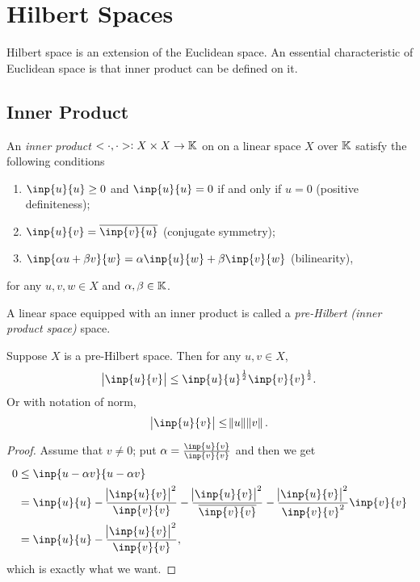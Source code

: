 \chapter{Hilbert Spaces}
\label{chp:hilbert_spaces}
Hilbert space is an extension of the Euclidean space. 
An essential characteristic of Euclidean space is that inner product can be 
defined on it. 

\section{Inner Product}
\begin{defn}
An \emph{inner product} $<\cdot, \cdot>: X \times X \to \mathbb{K}$ on on a linear 
space $X$ over $\mathbb{K}$ satisfy the following conditions
\begin{enumerate}
    \item $\inp{u}{u} \ge 0$ and $\inp{u}{u} = 0$ if and only if $u = 0$ 
    (positive definiteness);
    \item $\inp{u}{v} = \conj{\inp{v}{u}}$ (conjugate symmetry);
    \item $\inp{\alpha u + \beta v}{w} = \alpha \inp{u}{w} + 
    \beta \inp{v}{w}$ (bilinearity),
\end{enumerate}
for any $u, v, w \in X$ and $\alpha, \beta \in \mathbb{K}$. 

A linear space equipped with an inner product is called a \emph{pre-Hilbert 
(inner product space)} space.
\end{defn}

\begin{thm}
Suppose $X$ is a pre-Hilbert space. Then for any $u, v \in X$, 
\begin{equation}
    \abs{\inp{u}{v}} \le \inp{u}{u}^{\frac{1}{2}} \inp{v}{v}^{\frac{1}{2}}.
\end{equation}
Or with notation of norm, 
\begin{equation}
    \abs{\inp{u}{v}} \le \norm{u} \norm{v}.
\end{equation}
\end{thm}
\begin{proof}
Assume that $v \neq 0$; put $\alpha = \frac{\inp{u}{v}}{\inp{v}{v}}$ and 
then we get 
\begin{equation}
\begin{aligned}
    0 &\le \inp{u-\alpha v}{u-\alpha v} \\ 
    &= \inp{u}{u} - \frac{\abs{\inp{u}{v}}^2}
    {\inp{v}{v}} - \frac{\abs{\inp{u}{v}}^2} {\conj{\inp{v}{v}}} - 
    \frac{\abs{\inp{u}{v}} ^2}{\inp{v}{v} ^2} \inp{v}{v} \\
    &= \inp{u}{u} - \frac{\abs{\inp{u}{v}} ^2}{\inp{v}{v}},
\end{aligned}
\end{equation}
which is exactly what we want.
\end{proof}

